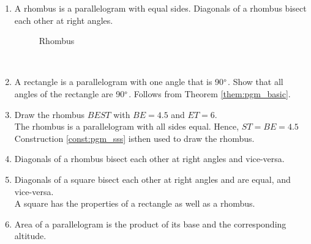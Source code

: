 \begin{enumerate}[label=\arabic*.,ref=\thesubsection.\theenumi]
\item A rhombus is a parallelogram with equal sides.  Diagonals of a rhombus bisect each other at right angles.
%
\begin{figure}[!ht]
	\begin{center}
		\resizebox{\columnwidth}{!}{}
	\end{center}
	\caption{Rhombus}
	\label{fig:rhom_sss}	
\end{figure}
%
\\
\solution 
\item A rectangle is a parallelogram with one angle that is 90$\degree$.  Show that all angles of the rectangle are 90$\degree$.
\solution Follows from Theorem \ref{them:pgm_basic}.

\item Draw the rhombus $BEST$ with $BE = 4.5$ and $ET = 6$. 
\\
\solution The rhombus is a parallelogram with all sides equal.  Hence, $ST = BE = 4.5$ Construction \ref{const:pgm_sss} isthen used to draw the rhombus.

%
%
\item  Diagonals of a rhombus bisect each other at right angles and vice-versa. 
%
%
\item  Diagonals of a square bisect each other at right angles and are equal, and vice-versa. 
%
\\
\solution A square has the properties of a rectangle as well as a rhombus.
%
%
\item Area of a parallelogram is the product of its base and the corresponding altitude. 
%
\end{enumerate}

